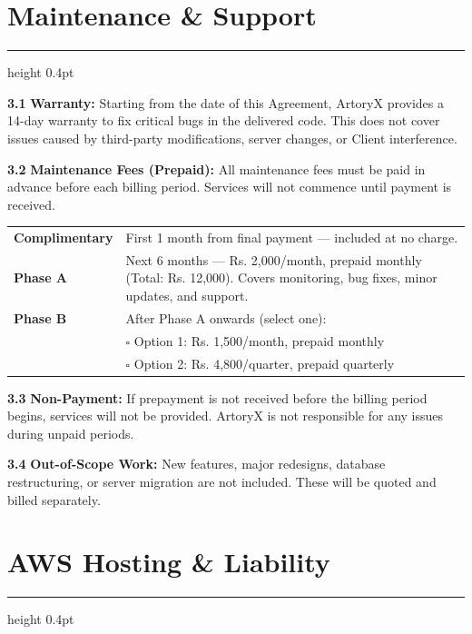 \documentclass[a4paper, 11pt]{article}
\newcommand{\sectionrule}{%
  {\color{bordergray}\hrule height 0.4pt}%
  \vspace{5pt}%
}
\newcommand{\clausenum}[1]{%
  {\color{accent}\textbf{#1}}\;%
}
\begin{document}
\section{Maintenance \& Support}
\sectionrule

{\small
\clausenum{3.1}\textbf{Warranty:}
Starting from the date of this Agreement, ArtoryX provides a 14-day warranty to fix critical bugs in the delivered code. This does not cover issues caused by third-party modifications, server changes, or Client interference.

\clausenum{3.2}\textbf{Maintenance Fees (Prepaid):}
All maintenance fees must be paid in advance before each billing period. Services will not commence until payment is received.

\vspace{2mm}
\noindent
\begin{tabularx}{\textwidth}{@{} >{\bfseries\small\color{accent}}l @{\hspace{8pt}} >{\small}X @{}}
  \arrayrulecolor{bordergray}
  Complimentary & First 1 month from final payment --- included at no charge. \\[4pt]
  Phase A       & Next 6 months --- Rs. 2,000/month, prepaid monthly (Total: Rs. 12,000). Covers monitoring, bug fixes, minor updates, and support. \\[4pt]
  Phase B       & After Phase A onwards (select one):\\
                & \;$\square$\; Option 1: Rs. 1,500/month, prepaid monthly\\
                & \;$\square$\; Option 2: Rs. 4,800/quarter, prepaid quarterly\\
\end{tabularx}

\vspace{2mm}
\clausenum{3.3}\textbf{Non-Payment:}
If prepayment is not received before the billing period begins, services will not be provided. ArtoryX is not responsible for any issues during unpaid periods.

\clausenum{3.4}\textbf{Out-of-Scope Work:}
New features, major redesigns, database restructuring, or server migration are not included. These will be quoted and billed separately.
}


\section{AWS Hosting \& Liability}
\sectionrule
\end{document}
